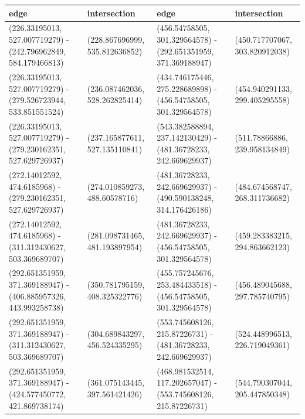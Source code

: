 \begin{table}
	\centering
	\footnotesize{
		\begin{tabular}{ll|ll}
		edge & intersection & edge & intersection\\
		\hline
		(\num{226.33195013}, \num{527.007719279}) - (\num{242.796962849}, \num{584.179466813})	&	(\num{228.867696999}, \num{535.812636852})	&	 (\num{456.54758505}, \num{301.329564578}) - (\num{292.651351959}, \num{371.369188947})	&	(\num{450.717707067}, \num{303.820912038})	\\
		(\num{226.33195013}, \num{527.007719279}) - (\num{279.526723944}, \num{533.851551524})	&	(\num{236.087462036}, \num{528.262825414})	&	 (\num{434.746175446}, \num{275.228689898}) - (\num{456.54758505}, \num{301.329564578})	&	(\num{454.940291133}, \num{299.405295558})	\\ 
		(\num{226.33195013}, \num{527.007719279}) - (\num{279.230162351}, \num{527.629726937})	&	(\num{237.165877611}, \num{527.135110841})	&	 (\num{543.382588894}, \num{237.142130429}) - (\num{481.36728233}, \num{242.669629937})	&	(\num{511.78866886}, \num{239.958134849})	\\ 
		(\num{272.14012592}, \num{474.6185968}) - (\num{279.230162351}, \num{527.629726937})	&	(\num{274.010859273}, \num{488.60578716})	&	 (\num{481.36728233}, \num{242.669629937}) - (\num{490.590138248}, \num{314.176426186})	&	(\num{484.674568747}, \num{268.311736682})	\\ 
		(\num{272.14012592}, \num{474.6185968}) - (\num{311.312430627}, \num{503.369689707})	&	(\num{281.098731465}, \num{481.193897954})	&	 (\num{481.36728233}, \num{242.669629937}) - (\num{456.54758505}, \num{301.329564578})	&	(\num{459.283383215}, \num{294.863662123})	\\ 
		(\num{292.651351959}, \num{371.369188947}) - (\num{406.885957326}, \num{443.993258738})	&	(\num{350.781795159}, \num{408.325322776})	&	 (\num{455.757245676}, \num{253.484433518}) - (\num{456.54758505}, \num{301.329564578})	&	(\num{456.489045688}, \num{297.785740795})	\\ 
		(\num{292.651351959}, \num{371.369188947}) - (\num{311.312430627}, \num{503.369689707})	&	(\num{304.689843297}, \num{456.524335295})	&	 (\num{553.745608126}, \num{215.87226731}) - (\num{481.36728233}, \num{242.669629937})	&	(\num{524.448996513}, \num{226.719049361})	\\ 
		(\num{292.651351959}, \num{371.369188947}) - (\num{424.577450772}, \num{421.869738174})	&	(\num{361.075143445}, \num{397.561421426})	&	 (\num{468.981532514}, \num{117.202657047}) - (\num{553.745608126}, \num{215.87226731})	&	(\num{544.790307044}, \num{205.447850348})	\\	 	

\end{tabular}}
\end{table}
